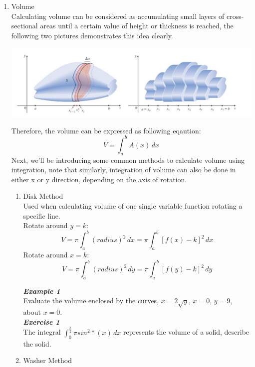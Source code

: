 \documentclass[12px]{article}
\begin{document}
\begin{enumerate}
    \item Volume\\
    \hspace*{2em}Calculating volume can be considered as accumulating small layers of cross-sectional areas until a certain value of height or thickness is reached, the following two pictures demonstrates this idea clearly.
    \begin{center}
        \includegraphics[width=15cm]{V.png}
    \end{center}
    \hspace*{2em}Therefore, the volume can be expressed as following eqaution:
    $$V=\displaystyle\int_a^bA(x)\,dx$$
    \hspace*{2em}Next, we’ll be introducing some common methods to calculate volume using integration, note that similarly, integration of volume can also be done in either x or y direction, depending on the axis of rotation.\\
    \begin{enumerate}[(1)]
        \item Disk Method\\
        \hspace*{2em}Used when calculating volume of one single variable function rotating a specific line.\\
        Rotate around $y=k$:
        $$V=\pi\int_a^b(radius)^2\,dx=\pi\int_a^b[f(x)-k]^2\,dx$$
        Rotate around $x=k$:
        $$V=\pi\int_a^b(radius)^2\,dy=\pi\int_a^b[f(y)-k]^2\,dy$$
    \begin{multicols}{2}
        \textit{\textbf{Example 1}}\\
        Evaluate the volume enclosed by the curves, $x=2\sqrt y$, $x=0$, $y=9$, about $x=0$.\\
        \textit{\textbf{Exercise 1}}\\
        The integral $\displaystyle\int_0^{\frac{\pi}{2}}\pi sin^2*(x)\,dx$ represents the volume of a solid, describe the solid.
    \end{multicols}
\newpage        
        \item Washer Method\\

\end{enumerate}
\end{enumerate}
\end{document}
